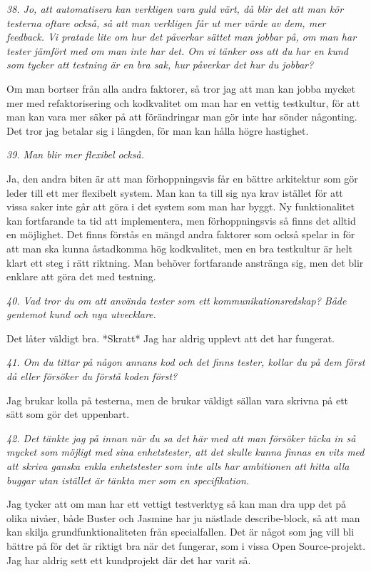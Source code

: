 \documentclass[11pt]{article}
\begin{document}
\emph{38. Jo, att automatisera kan verkligen vara guld värt, då blir det att man kör testerna oftare också, så att man verkligen får ut mer värde av dem, mer feedback. Vi pratade lite om hur det påverkar sättet man jobbar på, om man har tester jämfört med om man inte har det. Om vi tänker oss att du har en kund som tycker att testning är en bra sak, hur påverkar det hur du jobbar?}

Om man bortser från alla andra faktorer, så tror jag att man kan jobba mycket mer med refaktorisering och kodkvalitet om man har en vettig testkultur, för att man kan vara mer säker på att förändringar man gör inte har sönder någonting. Det tror jag betalar sig i längden, för man kan hålla högre hastighet.

\emph{39. Man blir mer flexibel också.}

Ja, den andra biten är att man förhoppningsvis får en bättre arkitektur som gör leder till ett mer flexibelt system. Man kan ta till sig nya krav istället för att vissa saker inte går att göra i det system som man har byggt. Ny funktionalitet kan fortfarande ta tid att implementera, men förhoppningsvis så finns det alltid en möjlighet. Det finns förstås en mängd andra faktorer som också spelar in för att man ska kunna åstadkomma hög kodkvalitet, men en bra testkultur är helt klart ett steg i rätt riktning. Man behöver fortfarande anstränga sig, men det blir enklare att göra det med testning.

\emph{40. Vad tror du om att använda tester som ett kommunikationsredskap? Både gentemot kund och nya utvecklare.}

Det låter väldigt bra. *Skratt* Jag har aldrig upplevt att det har fungerat.

\emph{41. Om du tittar på någon annans kod och det finns tester, kollar du på dem först då eller försöker du förstå koden först?}

Jag brukar kolla på testerna, men de brukar väldigt sällan vara skrivna på ett sätt som gör det uppenbart.

\emph{42. Det tänkte jag på innan när du sa det här med att man försöker täcka in så mycket som möjligt med sina enhetstester, att det skulle kunna finnas en vits med att skriva ganska enkla enhetstester som inte alls har ambitionen att hitta alla buggar utan istället är tänkta mer som en specifikation.}

Jag tycker att om man har ett vettigt testverktyg så kan man dra upp det på olika nivåer, både Buster och Jasmine har ju nästlade describe-block, så att man kan skilja grundfunktionaliteten från specialfallen. Det är något som jag vill bli bättre på för det är riktigt bra när det fungerar, som i vissa Open Source-projekt. Jag har aldrig sett ett kundprojekt där det har varit så.
\end{document}
